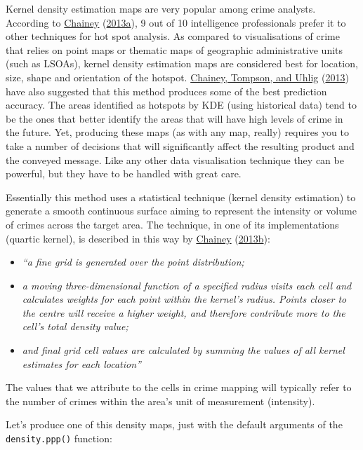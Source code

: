 \documentclass[
  krantz2]{krantz}
\providecommand{\tightlist}{%
  \setlength{\itemsep}{0pt}\setlength{\parskip}{0pt}}
\begin{document}
Kernel density estimation maps are very popular among crime analysts. According to \protect\hyperlink{ref-Chainey_2013a}{Chainey} (\protect\hyperlink{ref-Chainey_2013a}{2013a}), 9 out of 10 intelligence professionals prefer it to other techniques for hot spot analysis. As compared to visualisations of crime that relies on point maps or thematic maps of geographic administrative units (such as LSOAs), kernel density estimation maps are considered best for location, size, shape and orientation of the hotspot. \protect\hyperlink{ref-Chainey_2008}{Chainey, Tompson, and Uhlig} (\protect\hyperlink{ref-Chainey_2008}{2013}) have also suggested that this method produces some of the best prediction accuracy. The areas identified as hotspots by KDE (using historical data) tend to be the ones that better identify the areas that will have high levels of crime in the future. Yet, producing these maps (as with any map, really) requires you to take a number of decisions that will significantly affect the resulting product and the conveyed message. Like any other data visualisation technique they can be powerful, but they have to be handled with great care.

Essentially this method uses a statistical technique (kernel density estimation) to generate a smooth continuous surface aiming to represent the intensity or volume of crimes across the target area. The technique, in one of its implementations (quartic kernel), is described in this way by \protect\hyperlink{ref-Chainey_2013b}{Chainey} (\protect\hyperlink{ref-Chainey_2013b}{2013b}):

\begin{itemize}
\tightlist
\item
  \emph{``a fine grid is generated over the point distribution;}
\item
  \emph{a moving three-dimensional function of a specified radius visits each cell and calculates weights for each point within the kernel's radius. Points closer to the centre will receive a higher weight, and therefore contribute more to the cell's total density value;}
\item
  \emph{and final grid cell values are calculated by summing the values of all kernel estimates for each location''}
\end{itemize}

The values that we attribute to the cells in crime mapping will typically refer to the number of crimes within the area's unit of measurement (intensity).

Let's produce one of this density maps, just with the default arguments of the \texttt{density.ppp()} function:
\end{document}
